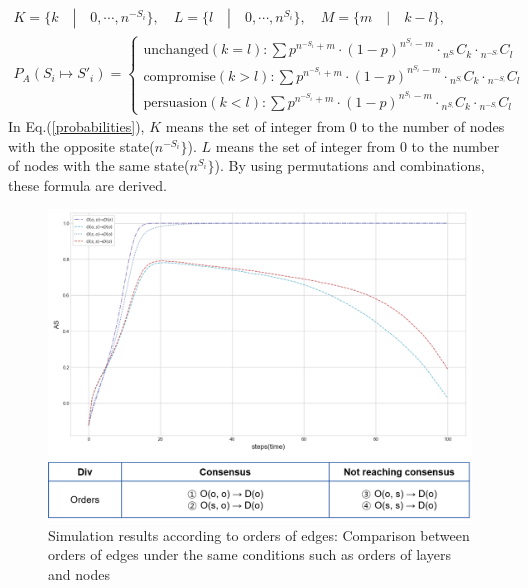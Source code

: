 \begin{equation}
\begin{array}{l}
K = \{ k \quad|\quad 0, \cdots ,{n^{ - {S_i}}}\}, \quad L = \{l \quad|\quad 0, \cdots ,{n^{{S_i}}}\},
\quad M = \{m \quad|\quad k-l\}, \\
{P_A}({S_i} \mapsto {{S'}_i}) = \begin{cases}
\mbox{unchanged}(k = l):\sum {{p^{{n^{ - {S_i}}}+m}} \cdot {{(1 - p)}^{{n^{{S_i}}}-m}} \cdot {}_{{n^{{S_{^i}}}}}{C_k} \cdot {}_{{n^{ - {S_{^i}}}}}{C_l}} \\
\mbox{compromise}(k > l):\sum {{p^{{n^{ - {S_i}}}+m}} \cdot {{(1 - p)}^{{n^{{S_i}}}-m}} \cdot {}_{{n^{{S_{^i}}}}}{C_k} \cdot {}_{{n^{ - {S_{^i}}}}}{C_l}} \\
\mbox{persuasion}(k < l):\sum {{p^{{n^{ - {S_i}}}+m}} \cdot {{(1 - p)}^{{n^{{S_i}}}-m}} \cdot {}_{{n^{{S_{^i}}}}}{C_k} \cdot {}_{{n^{ - {S_{^i}}}}}{C_l}} 
\end{cases}
\end{array}
\label{probabilities}
\end{equation}
In Eq.(\ref{probabilities}), $K$ means the set of integer from 0 to the number of nodes with the opposite state(${n^{ - {S_i}}}\}$). $L$ means the set of integer from 0 to the number of nodes with the same state(${n^{{S_i}}}\}$). By using permutations and combinations, these formula are derived.\\

\begin{figure}[!htb]
	\centering
	\includegraphics[width=\hsize]{figure/chap4_edgeorder.png}
	\caption{Simulation results according to orders of edges: Comparison between orders of edges under the same conditions such as orders of layers and nodes}
	\label{edgeorder}
\end{figure}

